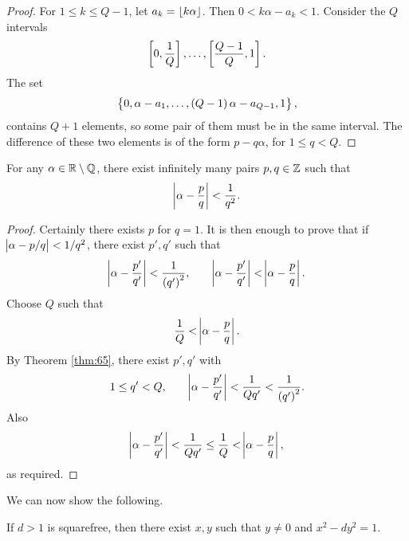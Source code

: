 \begin{proof}
For $ 1 \le k \le Q - 1 $, let $ a_k = \left\lfloor k\alpha \right\rfloor $. Then $ 0 < k\alpha - a_k < 1 $. Consider the $ Q $ intervals
$$ \sbr{0, \dfrac{1}{Q}}, \dots, \sbr{\dfrac{Q - 1}{Q}, 1}. $$
The set
$$ \cbr{0, \alpha - a_1, \dots, \br{Q - 1}\alpha - a_{Q - 1}, 1}, $$
contains $ Q + 1 $ elements, so some pair of them must be in the same interval. The difference of these two elements is of the form $ p - q\alpha $, for $ 1 \le q < Q $.
\end{proof}

\begin{corollary}
\label{cor:66}
For any $ \alpha \in \mathbb{R} \setminus \mathbb{Q} $, there exist infinitely many pairs $ p, q \in \mathbb{Z} $ such that
$$ \abs{\alpha - \dfrac{p}{q}} < \dfrac{1}{q^2}. $$
\end{corollary}

\begin{proof}
Certainly there exists $ p $ for $ q = 1 $. It is then enough to prove that if $ \abs{\alpha - p / q} < 1 / q^2 $, there exist $ p', q' $ such that
$$ \abs{\alpha - \dfrac{p'}{q'}} < \dfrac{1}{\br{q'}^2}, \qquad \abs{\alpha - \dfrac{p'}{q'}} < \abs{\alpha - \dfrac{p}{q}}. $$
Choose $ Q $ such that
$$ \dfrac{1}{Q} < \abs{\alpha - \dfrac{p}{q}}. $$
By Theorem \ref{thm:65}, there exist $ p', q' $ with
$$ 1 \le q' < Q, \qquad \abs{\alpha - \dfrac{p'}{q'}} < \dfrac{1}{Qq'} < \dfrac{1}{\br{q'}^2}. $$
Also
$$ \abs{\alpha - \dfrac{p'}{q'}} < \dfrac{1}{Qq'} \le \dfrac{1}{Q} < \abs{\alpha - \dfrac{p}{q}}, $$
as required.
\end{proof}

\pagebreak

We can now show the following.

\begin{theorem}
If $ d > 1 $ is squarefree, then there exist $ x, y $ such that $ y \ne 0 $ and $ x^2 - dy^2 = 1 $.
\end{theorem}

